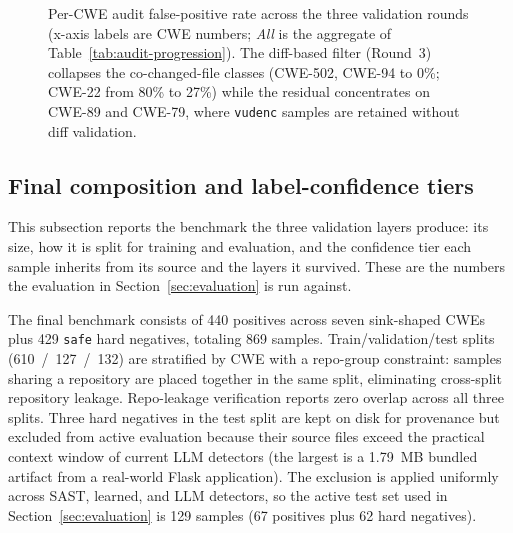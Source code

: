 \begin{figure}[h]
\centering
{}
\caption{Per-CWE audit false-positive rate across the three
validation rounds (x-axis labels are CWE numbers; \emph{All} is the
aggregate of Table~\ref{tab:audit-progression}). The diff-based
filter (Round~3) collapses the co-changed-file classes (CWE-502,
CWE-94 to 0\%; CWE-22 from 80\% to 27\%) while the residual
concentrates on CWE-89 and CWE-79, where \texttt{vudenc} samples
are retained without diff validation.}
\label{fig:fp-progression}
\end{figure}

\subsection{Final composition and label-confidence tiers}
\label{sec:dataset:final}

This subsection reports the benchmark the three validation layers
produce: its size, how it is split for training and evaluation, and
the confidence tier each sample inherits from its source and the
layers it survived. These are the numbers the evaluation in
Section~\ref{sec:evaluation} is run against.

The final benchmark consists of 440 positives across seven
sink-shaped CWEs plus 429 \texttt{safe} hard negatives, totaling
869 samples. Train/validation/test splits (610~/~127~/~132)
are stratified by CWE with a repo-group constraint: samples sharing
a repository are placed together in the same split, eliminating
cross-split repository leakage. Repo-leakage verification reports
zero overlap across all three splits. Three hard negatives in the
test split are kept on disk for provenance but excluded from active
evaluation because their source files exceed the practical context
window of current LLM detectors (the largest is a 1.79~MB bundled
artifact from a real-world Flask application). The exclusion is
applied uniformly across SAST, learned, and LLM detectors, so the
active test set used in Section~\ref{sec:evaluation} is 129 samples
(67 positives plus 62 hard negatives).


